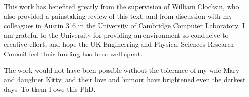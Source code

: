 This work has benefited greatly from the supervision of William Clocksin,
who also provided a painstaking review of this text,
and from discussion with my colleagues in Austin 316 in the University of
Cambridge Computer Laboratory.
I am grateful to the University for providing an environment so conducive
to creative effort, and hope the UK Engineering and Physical Sciences
Research Council feel their funding has been well spent.

The work would not have been possible without the tolerance of my
wife Mary and daughter Kitty, and their love and humour have brightened
even the darkest days.  To them I owe this PhD.



